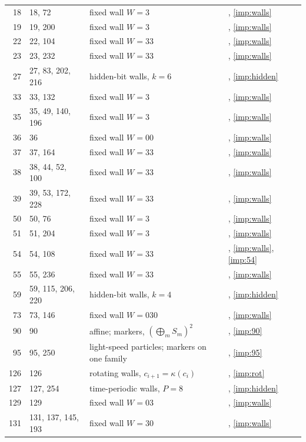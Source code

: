 \begin{table}[!htbp]
\begin{tabular}{rlll}
18 & 18, 72 & fixed wall $W=3$ & \cite{PaperC}, \eqref{imp:walls}\\
19 & 19, 200 & fixed wall $W=3$ & \cite{PaperC}, \eqref{imp:walls}\\
22 & 22, 104 & fixed wall $W=33$ & \cite{PaperC}, \eqref{imp:walls}\\
23 & 23, 232 & fixed wall $W=33$ & \cite{PaperC}, \eqref{imp:walls}\\
27 & 27, 83, 202, 216 & hidden-bit walls, $k=6$ & \cite{PaperC}, \eqref{imp:hidden}\\
33 & 33, 132 & fixed wall $W=3$ & \cite{PaperC}, \eqref{imp:walls}\\
35 & 35, 49, 140, 196 & fixed wall $W=3$ & \cite{PaperC}, \eqref{imp:walls}\\
36 & 36 & fixed wall $W=00$ & \cite{PaperC}, \eqref{imp:walls}\\
37 & 37, 164 & fixed wall $W=33$ & \cite{PaperC}, \eqref{imp:walls}\\
38 & 38, 44, 52, 100 & fixed wall $W=33$ & \cite{PaperC}, \eqref{imp:walls}\\
39 & 39, 53, 172, 228 & fixed wall $W=33$ & \cite{PaperC}, \eqref{imp:walls}\\
50 & 50, 76 & fixed wall $W=3$ & \cite{PaperC}, \eqref{imp:walls}\\
51 & 51, 204 & fixed wall $W=3$ & \cite{PaperC}, \eqref{imp:walls}\\
54 & 54, 108 & fixed wall $W=33$ & \cite{PaperC}, \eqref{imp:walls}, \eqref{imp:54}\\
55 & 55, 236 & fixed wall $W=33$ & \cite{PaperC}, \eqref{imp:walls}\\
59 & 59, 115, 206, 220 & hidden-bit walls, $k=4$ & \cite{PaperC}, \eqref{imp:hidden}\\
73 & 73, 146 & fixed wall $W=030$ & \cite{PaperC}, \eqref{imp:walls}\\
90 & 90 & affine; markers, $(\bigoplus_mS_m)^2$ & \cite{PaperC}, \eqref{imp:90}\\
95 & 95, 250 & light-speed particles; markers on one family & \cite{PaperE}, \eqref{imp:95}\\
126 & 126 & rotating walls, $c_{i+1}=\kappa(c_i)$ & \cite{PaperC}, \eqref{imp:rot}\\
127 & 127, 254 & time-periodic walls, $P=8$ & \cite{PaperC}, \eqref{imp:hidden}\\
129 & 129 & fixed wall $W=03$ & \cite{PaperC}, \eqref{imp:walls}\\
131 & 131, 137, 145, 193 & fixed wall $W=30$ & \cite{PaperC}, \eqref{imp:walls}\\

\end{tabular}
\end{table}

